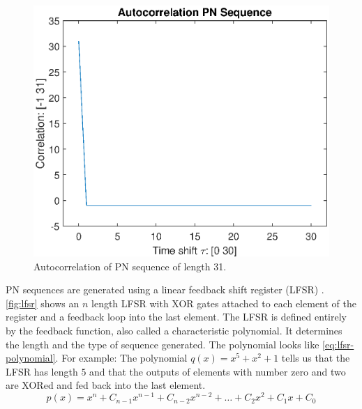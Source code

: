\begin{figure}[t]
	\centering
	\includegraphics[width=\textwidth]{chapters/cdma-chapters/codes/autocorr-pn.eps}
	\caption{Autocorrelation of PN sequence of length 31.}
	\label{fig:autocorr-pn}
\end{figure}





PN sequences are generated using a linear feedback shift register (LFSR) \cite{Wang:1988:LFS:52007.52024}.
\autoref{fig:lfsr} shows an $n$ length LFSR with XOR gates attached to each element of the register and a feedback loop into the last element. 
The LFSR is defined entirely by the feedback function, also called a characteristic polynomial.
It determines the length and the type of sequence generated.
The polynomial looks like \autoref{eq:lfsr-polynomial}.
For example: The polynomial $q(x) = x^5 + x^2 + 1$ tells us that the LFSR has length $5$ and that the outputs of elements with number zero and two are XORed and fed back into the last element. 
\vspace{-1mm}
\begin{equation}
	\label{eq:lfsr-polynomial}
	p(x) = x^n + C_{n-1} x^{n-1}  + C_{n-2} x^{n-2} + \dotsc + C_{2} x^{2}  + C_{1} x  + C_{0}
\end{equation}

